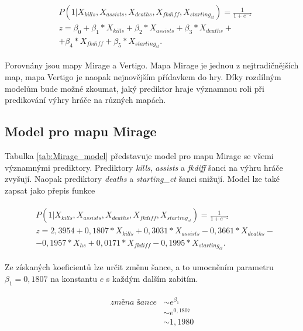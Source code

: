 \begin{align*}
    \begin{split}
        &P(1 | X_{kills}, X_{assists}, X_{deaths}, X_{fkdiff}, X_{starting_{ct}}) = \frac{1}{1 + e^{-z}} \\
        &z = \beta_0 + \beta_1*X_{kills} + \beta_2*X_{assists} + \beta_3*X_{deaths} + \\
        &+ \beta_4*X_{fkdiff} + \beta_5*X_{starting_{ct}}.
    \end{split}
\end{align*}

Porovnány jsou mapy Mirage a Vertigo. Mapa Mirage je jednou z nejtradičnějších map, mapa Vertigo je naopak nejnovějším přídavkem do hry.
Díky rozdílným modelům bude možné zkoumat, jaký prediktor hraje významnou roli při predikování výhry hráče na různých mapách.

\subsection{Model pro mapu Mirage}



Tabulka \ref{tab:Mirage_model} představuje model pro mapu Mirage se všemi významnými prediktory. Prediktory \textit{kills}, \textit{assists} a \textit{fkdiff} šanci na výhru
hráče zvyšují. Naopak prediktory \textit{deaths} a \textit{starting\_ct} šanci snižují. Model lze také zapsat jako přepis funkce

\begin{align}
    \begin{split}
        &P(1 | X_{kills}, X_{assists}, X_{deaths}, X_{fkdiff}, X_{starting_{ct}}) = \frac{1}{1 + e^{-z}} \\
        &z = 2,3954 + 0,1807*X_{kills} + 0,3031*X_{assists} - 0,3661*X_{deaths} - \\
        &- 0,1957*X_{hs} + 0,0171*X_{fkdiff} - 0,1995*X_{starting_{ct}}.
    \end{split}
\end{align}

Ze získaných koeficientů lze určit změnu šance, a to umocněním parametru $\beta_1 = 0,1807$ na konstantu $e$ s každým dalším zabitím.

\begin{align}
    \begin{split}
        \textit{změna šance} &\sim e^{\beta_1} \\
                             &\sim e^{0,1807} \\
                             &\sim 1,1980
    \end{split}
\end{align}

